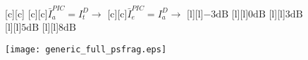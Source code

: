\documentclass{article}
\begin{document}
\begin{figure}[htb]
  \begin{center}

        [c][c]{}
        [c][c]{$\bar{I}_{a}^{PIC}=I_{t}^D \rightarrow$}
        [c][c]{$\bar{I}_{e}^{PIC}=I_{a}^D \rightarrow$}
        [l][l]{$\mathrm{-3dB}$}
        [l][l]{$\mathrm{0dB}$}
	[l]{$\mathrm{3dB}$}
	[l]{$\mathrm{5dB}$}
        [l][l]{$\mathrm{8dB}$}       

    \texttt{[image: generic\_full\_psfrag.eps]}
    \end{center}
\end{figure}
\end{document}
